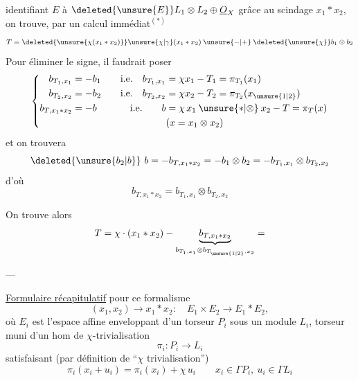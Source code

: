 identifiant $E$ à $\deleted{\unsure{E}}L_1\otimes L_2\oplus\underline O_X$ grâce au scindage \uline{$x_1*x_2$}, on trouve, par un calcul immédiat$^{(*)}$
\[
T=\deleted{\unsure{\chi(x_1*x_2)}}\unsure{\chi|\gamma}(x_1*x_2)\mathbin{\unsure{-|+}}\deleted{\unsure{\chi}}b_1\otimes b_2
\]
Pour éliminer le signe, il faudrait poser
\[
\left\{\begin{aligned}
b_{T_1,x_1}&=-b_1&\quad\text{i.e.}\quad b_{T_1,x_1}&=\chi x_1-T_1=\pi_{T_1}(x_1)\\
b_{T_2,x_2}&=-b_2&\text{i.e.}\quad b_{T_2,x_2}&=\chi x_2-T_2=\pi_{T_2}(x_{\unsure{1|2}})\\
b_{T,x_1*x_2}&=-b&\text{i.e.}\qquad b&=\chi\,x_1\mathbin{\unsure{*|\otimes}}x_2-T=\pi_T(x)\\
&&&(x=x_1\otimes x_2)
\end{aligned}\right.
\]
et on trouvera
\[
\deleted{\unsure{b_2|b}}\ b=-b_{T,x_1*x_2}=-b_1\otimes b_2=-b_{T_1,x_1}\otimes b_{T_2,x_2}
\]
d'où
\[
\boxed{b_{T,x_1*x_2}=b_{T_1,x_1}\otimes b_{T_2,x_2}}
\]

On trouve alors
\[
T=\chi\cdot(x_1*x_2)-\underbrace{b_{T,x_1*x_2}}_{b_{T_1,x_1}\otimes b_{T_{\unsure{1|2}},x_2}}=
\]
\centerline{---}
\uline{Formulaire récapitulatif} pour ce formalisme
\[
(x_1,x_2)\longrightarrow x_1*x_2:\quad E_1\times E_2\longrightarrow E_1*E_2,
\]
où $E_i$  est l'espace affine enveloppant d'un torseur $P_i$ sous un module  $L_i$, torseur muni d'un hom de $\chi$-trivialisation 
\[
\pi_i:P_i\longrightarrow L_i
\]
satisfaisant (par définition de ``$\chi$ trivialisation'')
\[
\pi_i(x_i+u_i)=\pi_i(x_i)+\chi\,u_i\qquad x_i\in\Gamma P_i,\ u_i\in\Gamma L_i
\]
